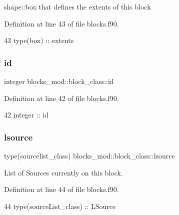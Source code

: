 shape\+::box that defines the extents of this block 



Definition at line 43 of file blocks.\+f90.


\begin{DoxyCode}
43         \textcolor{keywordtype}{type}(box) :: extents
\end{DoxyCode}
\mbox{\label{structblocks__mod_1_1block__class_addd1a493d56aa1ffd1bc27c56b682065}} 
\subsubsection{\texorpdfstring{id}{id}}
{\footnotesize\ttfamily integer blocks\+\_\+mod\+::block\+\_\+class\+::id\hspace{0.3cm}{\ttfamily [private]}}



Definition at line 42 of file blocks.\+f90.


\begin{DoxyCode}
42         \textcolor{keywordtype}{integer} :: id
\end{DoxyCode}
\mbox{\label{structblocks__mod_1_1block__class_a2f4d63afb2696e2728f20a99e26a4b18}} 
\subsubsection{\texorpdfstring{lsource}{lsource}}
{\footnotesize\ttfamily type(sourcelist\+\_\+class) blocks\+\_\+mod\+::block\+\_\+class\+::lsource\hspace{0.3cm}{\ttfamily [private]}}



List of Sources currently on this block. 



Definition at line 44 of file blocks.\+f90.


\begin{DoxyCode}
44         \textcolor{keywordtype}{type}(sourceList\_class) :: LSource
\end{DoxyCode}
\mbox{\label{structblocks__mod_1_1block__class_ab4e2108886a09ba919d01474503f6165}} 
